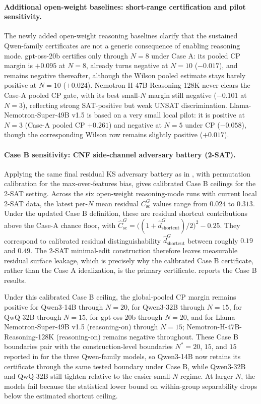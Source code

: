 \documentclass[conference]{IEEEtran}
\theoremstyle{remark}
\newcommand{\hatshortcutDisc}{\hat d_{\mathrm{shortcut}}^{G}}
\newcommand{\shortcutCeiling}{C_{\mathrm{sc}}^{G}}
\newcommand{\hatshortcutCeiling}{\widehat{C}_{\mathrm{sc}}^{G}}
\begin{document}
\paragraph{Additional open-weight baselines: short-range certification and pilot sensitivity.}
The newly added open-weight reasoning baselines clarify that the sustained Qwen-family certificates are not a generic consequence of enabling reasoning mode.
gpt-oss-20b certifies only through $N=8$ under Case A: its pooled CP margin is $+0.095$ at $N=8$, already turns negative at $N=10$ ($-0.017$), and remains negative thereafter, although the Wilson pooled estimate stays barely positive at $N=10$ ($+0.024$).
Nemotron-H-47B-Reasoning-128K never clears the Case-A pooled CP gate, with its best small-$N$ margin still negative ($-0.101$ at $N=3$), reflecting strong SAT-positive but weak UNSAT discrimination.
Llama-Nemotron-Super-49B v1.5 is based on a very small local pilot: it is positive at $N=3$ (Case-A pooled CP $+0.261$) and negative at $N=5$ under CP ($-0.058$), though the corresponding Wilson row remains slightly positive ($+0.017$).

\paragraph{Case B sensitivity: CNF side-channel adversary battery (2-SAT).}
Applying the same final residual KS adversary battery as in , with permutation calibration for the max-over-features bias, gives calibrated Case B ceilings for the 2-SAT setting.
Across the six open-weight reasoning-mode runs with current local 2-SAT data, the latest per-$N$ mean residual $\shortcutCeiling$ values range from $0.024$ to $0.313$.
Under the updated Case B definition, these are residual shortcut contributions above the Case-A chance floor, with $\hatshortcutCeiling=\bigl((1+\hatshortcutDisc)/2\bigr)^2-0.25$.  They correspond to calibrated residual distinguishability $\hatshortcutDisc$ between roughly $0.19$ and $0.49$.  The 2-SAT minimal-edit construction therefore leaves measurable residual surface leakage, which is precisely why the calibrated Case B certificate, rather than the Case A idealization, is the primary certificate.
 reports the Case B results.

Under this calibrated Case B ceiling, the global-pooled CP margin remains positive for Qwen3-14B through $N=20$, for Qwen3-32B through $N=15$, for QwQ-32B through $N=15$, for gpt-oss-20b through $N=20$, and for Llama-Nemotron-Super-49B v1.5 (reasoning-on) through $N=15$; Nemotron-H-47B-Reasoning-128K (reasoning-on) remains negative throughout.
These Case B boundaries pair with the construction-level boundaries $N^*=20$, $15$, and $15$ reported in  for the three Qwen-family models, so Qwen3-14B now retains its certificate through the same tested boundary under Case B, while Qwen3-32B and QwQ-32B still tighten relative to the easier small-$N$ regime.
At larger $N$, the models fail because the statistical lower bound on within-group separability drops below the estimated shortcut ceiling.
\end{document}
